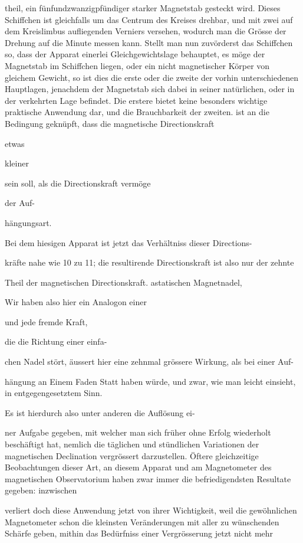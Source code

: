 \documentclass[12pt,a4paper]{article}
\begin{document}
theil, ein fünfundzwanzigpfündiger starker Magnetstab gesteckt wird. Dieses Schiffchen ist gleichfalls um das Centrum des Kreises drehbar, und mit zwei auf dem Kreislimbus aufliegenden Verniers versehen, wodurch man die Grösse der Drehung auf die Minute messen kann. Stellt man nun zuvörderst das Schiffchen so, dass der Apparat einerlei Gleichgewichtslage behauptet, es möge der Magnetstab im Schiffchen liegen, oder ein nicht magnetischer Körper von gleichem Gewicht, so ist dies die erste oder die zweite der vorhin unterschiedenen Hauptlagen, jenachdem der Magnetstab sich dabei in seiner natürlichen, oder in der verkehrten Lage befindet. Die erstere bietet keine besonders wichtige praktische Anwendung dar, und die Brauchbarkeit der zweiten. ist an die Bedingung geknüpft, dass die magnetische Directionskraft

etwas

kleiner

sein soll, als die Directionskraft vermöge

der Auf-

hängungsart.

Bei dem hiesigen Apparat ist jetzt das Verhältniss dieser Directions-

kräfte nahe wie 10 zu 11; die resultirende Directionskraft ist also nur der zehnte

Theil der magnetischen Directionskraft. astatischen Magnetnadel,

Wir haben also hier ein Analogon einer

und jede fremde Kraft,

die die Richtung einer einfa-

chen Nadel stört, äussert hier eine zehnmal grössere Wirkung, als bei einer Auf-

hängung an Einem Faden Statt haben würde, und zwar, wie man leicht einsieht, in entgegengesetztem Sinn.

Es ist hierdurch also unter anderen die Auflösung ei-

ner Aufgabe gegeben, mit welcher man sich früher ohne Erfolg wiederholt beschäftigt hat, nemlich die täglichen und stündlichen Variationen der magnetischen Declination vergrössert darzustellen. Öftere gleichzeitige Beobachtungen dieser Art, an diesem Apparat und am Magnetometer des magnetischen Observatorium haben zwar immer die befriedigendsten Resultate gegeben: inzwischen

verliert doch diese Anwendung jetzt von ihrer Wichtigkeit, weil die gewöhnlichen Magnetometer schon die kleinsten Veränderungen mit aller zu wünschenden Schärfe geben, mithin das Bedürfniss einer Vergrösserung jetzt nicht mehr
\end{document}
